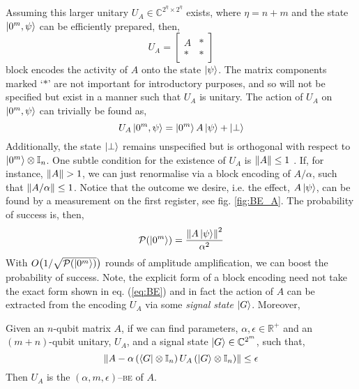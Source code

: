 \documentclass{article}
\begin{document}
Assuming this larger unitary $U_A\in\mathbb{C}^{2^\eta\times 2^\eta}$ exists, where $\eta = n+m$ and the state $\ket{0^m,\psi}$ can be efficiently prepared, then,
\begin{equation}\label{eq:BE}
    U_A = \begin{bmatrix}A & * \\ * & *\end{bmatrix}
\end{equation}
block encodes the activity of $A$ onto the state $\ket{\psi}$. The matrix components marked `$*$' are not important for introductory purposes, and so will not be specified but exist in a manner such that $U_A$ is unitary. The action of $U_A$ on $\ket{0^m,\psi}$ can trivially be found as,
\begin{equation}\label{eq:BE_states}
    U_A\ket{0^m,\psi} = \ket{0^m}A\ket{\psi} + \ket{\perp}
\end{equation}
Additionally, the state $\ket{\perp}$ remains unspecified but is orthogonal with respect to $\ket{0^m}\otimes \mathbb{I}_n$. One subtle condition for the existence of $U_A$ is $\norm{A}\leq 1$ \cite{CLBY23}. If, for instance, $\norm{A}>1$, we can just renormalise via a block encoding of $A/\alpha$, such that $\norm{A/\alpha}\leq 1$. Notice that the outcome we desire, i.e. the effect, $A\ket{\psi}$, can be found by a measurement on the first register, see fig. \ref{fig:BE_A}. The probability of success is, then,
\begin{equation}
    \mathcal{P}(\ket{0^m}) = \frac{\norm{A\ket{\psi}}^2}{\alpha^2}
\end{equation}
With $O\big(1/\sqrt{\mathcal{P}(\ket{0^m})}\big)$ rounds of amplitude amplification, we can boost the probability of success. Note, the explicit form of a block encoding need not take the exact form shown in eq. (\ref{eq:BE}) and in fact the action of $A$ can be extracted from the encoding $U_A$ via some \emph{signal state} $\ket{G}$. Moreover,
\begin{defn}{\textnormal{\cite{LinLin22,LC19}}}

    \noindent Given an $n$-qubit matrix $A$, if we can find parameters, $\alpha, \epsilon \in \mathbb{R}^+$ and an $(m+n)$-qubit unitary, $U_A$, and a signal state $\ket{G}\in\mathbb{C}^{2^m}$, such that, 
    \begin{equation}
    \norm{A - \alpha \left(\bra{G}\otimes\mathbb{I}_n\right)U_A\left(\ket{G}\otimes\mathbb{I}_n\right)} \leq \epsilon
    \end{equation}
    Then $U_A$ is the $(\alpha, m, \epsilon)$--\textsc{be} of $A$.
\end{defn}
\end{document}
